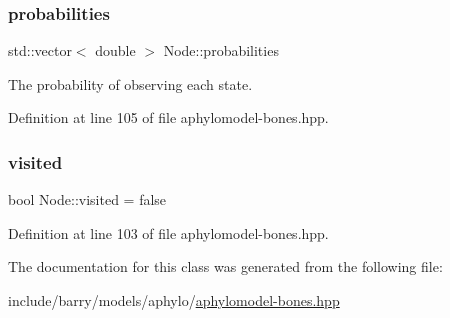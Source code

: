 \subsubsection{\texorpdfstring{probabilities}{probabilities}}
{\footnotesize\ttfamily std\+::vector$<$ double $>$ Node\+::probabilities}



The probability of observing each state. 



Definition at line 105 of file aphylomodel-\/bones.\+hpp.

\mbox{\label{class_node_aa1bdec4e775fc578632e6a2dced9e251}} 
\subsubsection{\texorpdfstring{visited}{visited}}
{\footnotesize\ttfamily bool Node\+::visited = false}



Definition at line 103 of file aphylomodel-\/bones.\+hpp.



The documentation for this class was generated from the following file\+:\begin{DoxyCompactItemize}
\item 
include/barry/models/aphylo/\hyperlink{aphylomodel-bones_8hpp}{aphylomodel-\/bones.\+hpp}\end{DoxyCompactItemize}
